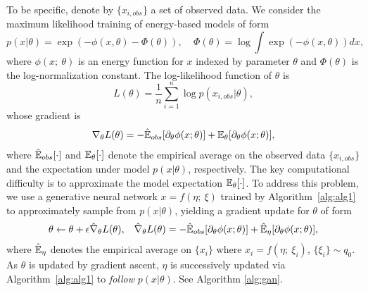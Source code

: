\documentclass{article} %
\begin{document}
To be specific, denote by $\{x_{i,obs}\}$ a set of observed data. 
We consider the maximum likelihood training of energy-based models of form 
$$
p(x|\theta) = \exp(-\phi(x, \theta) - \Phi(\theta)), ~~~~~ \Phi(\theta) = \log \int \exp(-\phi(x,\theta))dx,
$$
where $\phi(x; ~\theta)$ is an energy function for $x$ indexed by parameter $\theta$ and $\Phi(\theta)$ is the log-normalization constant. %
The log-likelihood function of $\theta$ is %
$$
L(\theta)  =\frac{1}{n}\sum_{i=1}^n\log p(x_{i,obs} | \theta),
$$
whose gradient is %
\begin{align*}%
\nabla_\theta L(\theta) = -  \hat\E_{obs} [\partial_\theta \phi (x; \theta) ] +    \E_\theta [\partial_\theta \phi(x; \theta) ], 
\end{align*}
where $\hat{\mathbb{E}}_{obs}[\cdot]$ and $\mathbb{E}_\theta[\cdot]$ denote the empirical average on the observed data $\{x_{i,obs}\}$
and the expectation under model $p(x |\theta)$, respectively.  
The key computational difficulty is to approximate the model expectation $\mathbb{E}_{\theta}[\cdot]$. 
To address this problem, 
we use a generative neural network $x = f(\eta;~\xi)$ trained by Algorithm~\ref{alg:alg1} 
to approximately sample from $p(x|\theta)$, yielding a gradient update for $\theta$ of form
\begin{align}\label{equ:updatetheta}
\theta \gets \theta + \epsilon \hat\nabla_\theta L(\theta),  &\text{}& 
 \hat \nabla_\theta L(\theta) =  - \hat{\mathbb{E}}_{obs} [\partial_\theta \phi (x; \theta) ] +   \hat{\mathbb{E}}_{\eta} [\partial_\theta \phi(x; \theta) ], 
\end{align}
where $\hat {\mathbb{E}}_{\eta}$ denotes the empirical average on $\{x_i\}$ where $x_i = f(\eta;~\xi_i)$, 
$\{\xi_i\}\sim q_0$. 
As $\theta$ is updated by gradient ascent, 
$\eta$ is successively updated via Algorithm~\ref{alg:alg1} to \emph{follow} $p(x|\theta)$. 
See Algorithm \ref{alg:gan}. 
\end{document}
